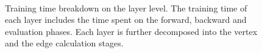 \begin{figure}
    \centering
    \\
    \caption{Training time breakdown on the layer level. The training time of each layer includes the time spent on the forward, backward and evaluation phases. Each layer is further decomposed into the vertex and the edge calculation stages.}
    \label{fig:exp_vertex_edge_cal_proportion}
\end{figure}

